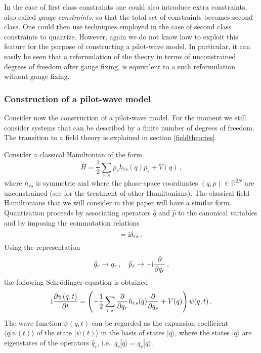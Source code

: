\documentclass[12pt]{article}
\def\la{\langle}
\def\ra{\rangle}
\def\pa{\partial}
\def\ii{\textrm i}
\begin{document}
In the case of first class constraints one could also introduce extra constraints, also called {\em gauge constraints}, so that the total set of constraints becomes second class. One could then use techniques employed in the case of second class constraints to quantize. However, again we do not know how to exploit this feature for the purpose of constructing a pilot-wave model. In particular, it can easily be seen that a reformulation of the theory in terms of unconstrained degrees of freedom after gauge fixing, is equivalent to a such reformulation without gauge fixing. 


\subsubsection{Construction of a pilot-wave model}\label{construction of a pilot-wave model}
Consider now the construction of a pilot-wave model. For the moment we still consider systems that can be described by a finite number of degrees of freedom. The transition to a field theory is explained in section \ref{fieldtheories}.

Consider a classical Hamiltonian of the form 
\begin{equation}
H= \frac{1}{2} \sum_{r,s} p_r h_{rs} (q) p_s + V(q)\,,
\label{f.14}
\end{equation} 
where $h_{rs}$ is symmetric and where the phase-space coordinates $(q,p) \in {\mathbb{R}}^{2N}$ are unconstrained (see \cite{struyve09a} for the treatment of other Hamiltonians). The classical field Hamiltonians that we will consider in this paper will have a similar form. Quantization proceeds by associating operators ${\widehat q}$ and ${\widehat p}$ to the canonical variables and by imposing the commutation relations
\begin{equation}
[{\widehat q}_r,{\widehat p}_s] = \ii \delta_{rs}\,.
\label{f.15}
\end{equation}
Using the representation 
\begin{equation}
{\widehat q}_r \to q_r \,, \quad    {\widehat p}_r  \to -\ii \frac{\partial}{\partial q_r} \,,
\label{f.16}
\end{equation}
the following Schr{\"o}\-ding\-er equation is obtained
\begin{equation}
\ii\frac{\pa \psi(q,t) }{\pa t} = \left( -\frac{1}{2} \sum_{r,s} \frac{\partial}{\partial q_r}  h_{rs} (q) \frac{\partial}{\partial q_s}  + V(q) \right)\psi(q,t) \,.
\label{f.17}
\end{equation}
The wave function $\psi(q,t)$ can be regarded as the expansion coefficient $\la q| \psi (t)\ra$ of the state $|\psi(t)\ra$ in the basis of states $|q\ra$, where the states $|q\ra$ are eigenstates of the operators ${\widehat q}_r$, i.e.\ ${\widehat q}_r|q\ra = q_r |q\ra$.
\end{document}
